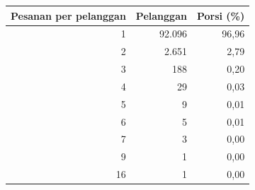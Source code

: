\begin{tabular}{rrr}
\toprule
Pesanan per pelanggan & Pelanggan & Porsi (\%) \\
\midrule
1 & 92.096 & 96,96 \\
2 & 2.651 & 2,79 \\
3 & 188 & 0,20 \\
4 & 29 & 0,03 \\
5 & 9 & 0,01 \\
6 & 5 & 0,01 \\
7 & 3 & 0,00 \\
9 & 1 & 0,00 \\
16 & 1 & 0,00 \\
\bottomrule
\end{tabular}
